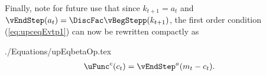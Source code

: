 \documentclass[titlepage, headings=optiontotocandhead]{\econtex}
\begin{document}
Finally, note for future use that since ${k}_{t+1}={a}_{t}$ and $\vEndStep({a}_{t})=\DiscFac \vBegStepp({{k}_{t+1}})$, the first order condition 
(\ref{eq:upceqEvtp1}) can now be rewritten compactly as
\begin{verbatimwrite}{./Equations/upEqbetaOp.tex}
  \begin{equation}\begin{gathered}\begin{aligned}
        \uFunc^{{c}}({c}_{\stge})   & = \vEndStep^{{a}}({m}_{\stge}-{c}_{\stge}).
        \label{eq:upEqbetaOp}
      \end{aligned}\end{gathered}\end{equation}
\end{verbatimwrite}
\unskip
\end{document}
